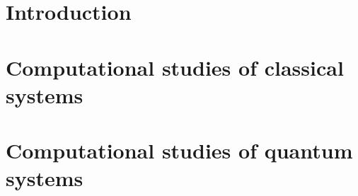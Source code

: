 \documentclass[a4paper,11pt]{book}
\makeatletter
\def\cleardoublepage{
    \clearpage
    \if@twoside
        \ifodd
            \c@page
        \else
            \hbox{}
            \thispagestyle{empty}
            \newpage
            \if@twocolumn
                \hbox{}
                \newpage
            \fi
        \fi
    \fi
}
\makeatother
\begin{document}
\frontmatter



\setcounter{page}{0}


\cleardoublepage
{}
\tableofcontents

\cleardoublepage
{}
{}
\listoffigures


\mainmatter
\part{Introduction}


\part{Computational studies of classical systems}



\part{Computational studies of quantum systems}






\cleardoublepage
{}


\backmatter

\end{document}
